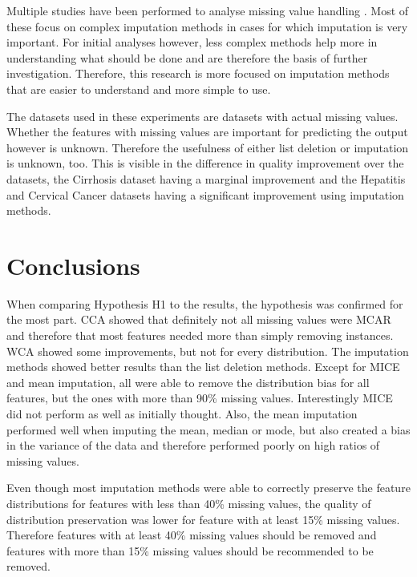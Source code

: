 \documentclass[10pt,a4paper]{report}
\begin{document}
	Multiple studies have been performed to analyse missing value handling \cite{donders2006gentle, haukoos2007advanced, patrician2002multiple, sterne2009multiple, pedersen2017missing, raghunathan2001multivariate}. Most of these focus on complex imputation methods in cases for which imputation is very important. For initial analyses however, less complex methods help more in understanding what should be done and are therefore the basis of further investigation. Therefore, this research is more focused on imputation methods that are easier to understand and more simple to use.
	
	The datasets used in these experiments are datasets with actual missing values. Whether the features with missing values are important for predicting the output however is unknown. Therefore the usefulness of either list deletion or imputation is unknown, too. This is visible in the difference in quality improvement over the datasets, the Cirrhosis dataset having a marginal improvement and the Hepatitis and Cervical Cancer datasets having a significant improvement using imputation methods.
	
	\section{Conclusions}
	\label{MVsec:Conclusions}
	
	When comparing Hypothesis H1 to the results, the hypothesis was confirmed for the most part. CCA showed that definitely not all missing values were MCAR and therefore that most features needed more than simply removing instances. WCA showed some improvements, but not for every distribution. The imputation methods showed better results than the list deletion methods. Except for MICE and mean imputation, all were able to remove the distribution bias for all features, but the ones with more than 90\% missing values. Interestingly MICE did not perform as well as initially thought. Also, the mean imputation performed well when imputing the mean, median or mode, but also created a bias in the variance of the data and therefore performed poorly on high ratios of missing values.
	
	Even though most imputation methods were able to correctly preserve the feature distributions for features with less than 40\% missing values, the quality of distribution preservation was lower for feature with at least 15\% missing values. Therefore features with at least 40\% missing values should be removed and features with more than 15\% missing values should be recommended to be removed.	
	
\end{document}
